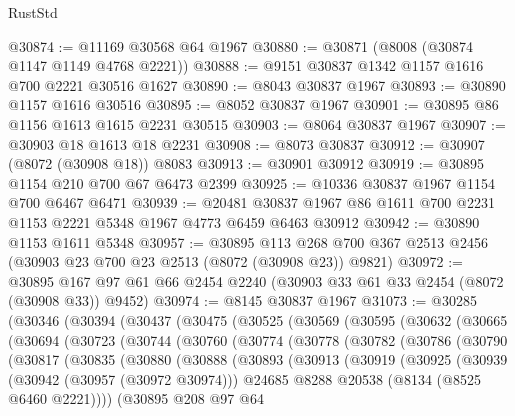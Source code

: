 \begin{lexlean}{RustStd}
\begin{coremodule}
{\begin{coremodule}
{{{{{{{{{{{{{{{{{{{{{{{{{{{{{{{{{{{{{{{{{{{{{{{{{{{{{@30874 := @11169 @30568 @64 @1967
@30880 := @30871 (@8008 (@30874 @1147 @1149 @4768 @2221))
@30888 := @9151 @30837 @1342 @1157 @1616 @700 @2221 @30516 @1627
@30890 := @8043 @30837 @1967
@30893 := @30890 @1157 @1616 @30516
@30895 := @8052 @30837 @1967
@30901 := @30895 @86 @1156 @1613 @1615 @2231 @30515
@30903 := @8064 @30837 @1967
@30907 := @30903 @18 @1613 @18 @2231
@30908 := @8073 @30837
@30912 := @30907 (@8072 (@30908 @18)) @8083
@30913 := @30901 @30912
@30919 := @30895 @1154 @210 @700 @67 @6473 @2399
@30925 := @10336 @30837 @1967 @1154 @700 @6467 @6471
@30939 := @20481 @30837 @1967 @86 @1611 @700 @2231 @1153 @2221 @5348 @1967 @4773 @6459 @6463 @30912
@30942 := @30890 @1153 @1611 @5348
@30957 := @30895
    @113
    @268
    @700
    @367
    @2513
    @2456
    (@30903 @23 @700 @23 @2513 (@8072 (@30908 @23)) @9821)
@30972 := @30895 @167 @97 @61 @66 @2454 @2240 (@30903 @33 @61 @33 @2454 (@8072 (@30908 @33)) @9452)
@30974 := @8145 @30837 @1967
@31073 := @30285
    (@30346
      (@30394
        (@30437
          (@30475
            (@30525
              (@30569
                (@30595
                  (@30632
                    (@30665
                      (@30694
                        (@30723
                          (@30744
                            (@30760
                              (@30774
                                (@30778
                                  (@30782
                                    (@30786
                                      (@30790
                                        (@30817
                                          (@30835
                                            (@30880
                                              (@30888
                                                (@30893
                                                  (@30913
                                                    (@30919
                                                      (@30925
                                                        (@30939
                                                          (@30942 (@30957 (@30972 @30974)))
                                                          @24685
                                                          @8288
                                                          @20538
                                                          (@8134 (@8525 @6460 @2221))))
                                                      (@30895
                                                        @208
                                                        @97
                                                        @64
}}}}}}}}}}}}}}}}}}}}}}}}}}}}}}}}}}}}}}}}}}}}}}}}}}}}}
\end{coremodule}}
\end{coremodule}
\end{lexlean}
